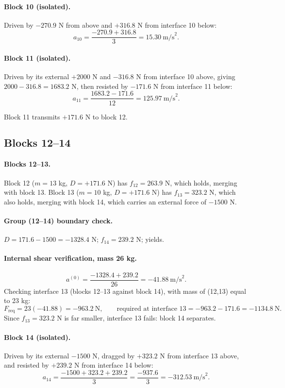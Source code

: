 \documentclass[11pt,a4paper]{article}
\begin{document}
\paragraph{Block 10 (isolated).} Driven by $-270.9$ N from above and $+316.8$ N from interface 10 below:
\[
a_{10} = \frac{-270.9+316.8}{3} = 15.30\ \text{m/s}^2 .
\]

\paragraph{Block 11 (isolated).} Driven by its external $+2000$ N and $-316.8$ N from interface 10 above, giving $2000-316.8=1683.2$ N, then resisted by $-171.6$ N from interface 11 below:
\[
a_{11} = \frac{1683.2-171.6}{12} = 125.97\ \text{m/s}^2 .
\]

Block 11 transmits $+171.6$ N to block 12.

\subsection{Blocks 12--14}

\paragraph{Blocks 12--13.} Block 12 ($m=13$ kg, $D=+171.6$ N) has $f_{12}=263.9$ N, which holds, merging with block 13. Block 13 ($m=10$ kg, $D=+171.6$ N) has $f_{13}=323.2$ N, which also holds, merging with block 14, which carries an external force of $-1500$ N.

\paragraph{Group (12--14) boundary check.} $D = 171.6-1500 = -1328.4$ N; $f_{14}=239.2$ N; yields.

\paragraph{Internal shear verification, mass 26 kg.}
\[
a^{(0)} = \frac{-1328.4+239.2}{26} = -41.88\ \text{m/s}^2 .
\]
Checking interface 13 (blocks 12--13 against block 14), with mass of (12,13) equal to 23 kg:
\[
F_{\mathrm{req}} = 23(-41.88) = -963.2\ \text{N}, \qquad \text{required at interface 13} = -963.2-171.6 = -1134.8\ \text{N}.
\]
Since $f_{13}=323.2$ N is far smaller, interface 13 fails: block 14 separates.

\paragraph{Block 14 (isolated).} Driven by its external $-1500$ N, dragged by $+323.2$ N from interface 13 above, and resisted by $+239.2$ N from interface 14 below:
\[
a_{14} = \frac{-1500+323.2+239.2}{3} = \frac{-937.6}{3} = -312.53\ \text{m/s}^2 .
\]
\end{document}
